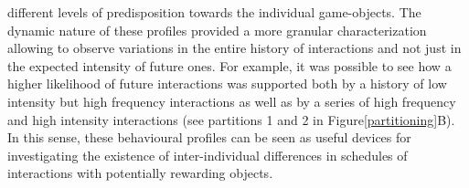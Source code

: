 different levels of predisposition towards the individual game-objects. The dynamic nature of these profiles provided a more granular characterization allowing to observe variations in the entire history of interactions and not just in the expected intensity of future ones. For example, it was possible to see how a higher likelihood of future interactions was supported both by a history of low intensity but high frequency interactions as well as by a series of high frequency and high intensity interactions (see partitions 1 and 2 in Figure\ref{partitioning}B). In this sense, these behavioural profiles can be seen as useful devices for investigating the existence of inter-individual differences in schedules of interactions with potentially rewarding objects.
